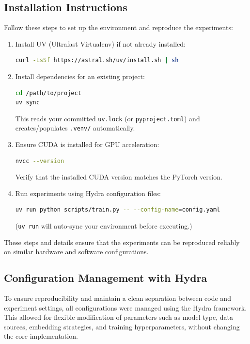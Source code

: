 \documentclass{SGGW-thesis-EN}
\begin{document}
\subsection{Installation Instructions}
Follow these steps to set up the environment and reproduce the experiments:
\begin{enumerate}
    \item Install UV (Ultrafast Virtualenv) if not already installed:
    \begin{lstlisting}[language=bash]
curl -LsSf https://astral.sh/uv/install.sh | sh
    \end{lstlisting}

    \item Install dependencies for an existing project:
    \begin{lstlisting}[language=bash]
cd /path/to/project
uv sync
    \end{lstlisting}
    This reads your committed \texttt{uv.lock} (or \texttt{pyproject.toml}) and creates/populates \texttt{.venv/} automatically.

    \item Ensure CUDA is installed for GPU acceleration:
    \begin{lstlisting}[language=bash]
nvcc --version
    \end{lstlisting}
    Verify that the installed CUDA version matches the PyTorch version.

    \item Run experiments using Hydra configuration files:
    \begin{lstlisting}[language=bash]
uv run python scripts/train.py -- --config-name=config.yaml
    \end{lstlisting}
    (\texttt{uv run} will auto-sync your environment before executing.)
\end{enumerate}

These steps and details ensure that the experiments can be reproduced reliably on similar hardware and software configurations.

\subsection{Configuration Management with Hydra}

To ensure reproducibility and maintain a clean separation between code and experiment settings, all configurations were managed using the  
Hydra framework. This allowed for flexible modification of parameters such as model type, data sources, embedding strategies, and training  
hyperparameters, without changing the core implementation.
\end{document}
